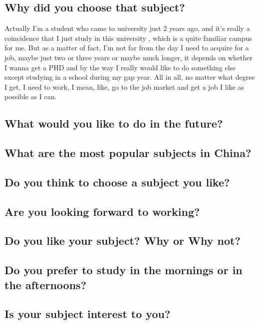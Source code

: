 \documentclass[conference]{IEEEtran}
\begin{document}
\subsection{Why did you choose that subject?}
Actually I’m a student who came to university just 2 years ago, 
and it’s really a coincidence that I just study in this university
, which is a quite familiar campus for me.
But as a matter of fact, I’m not far from the day I need to acquire for a job, 
maybe just two or three years or maybe much longer, 
it depends on whether I wanna get a PHD and by the way I really 
would like to do something else except studying in a school during my gap year. 
All in all, no matter what degree I get, I need to work, 
I mean, like, go to the job market and get a job I like as possible as I can.

\subsection{What would you like to do in the future?}

\subsection{What are the most popular subjects in China?}

\subsection{Do you think to choose a subject you like?}

\subsection{Are you looking forward to working?}

\subsection{Do you like your subject? Why or Why not?}

\subsection{Do you prefer to study in the mornings or in the afternoons?}

\subsection{Is your subject interest to you?}
\end{document}
